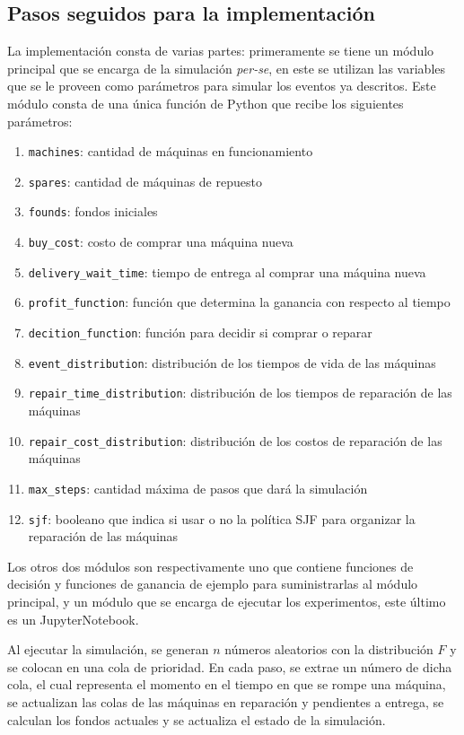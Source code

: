\documentclass[10pt,twocolumn]{article}
\begin{document}
\subsection{Pasos seguidos para la implementación}
La implementación consta de varias partes: primeramente se tiene un módulo principal que se encarga de la simulación \textit{per-se}, en este se utilizan las variables que se le proveen como parámetros para simular los eventos ya descritos. Este módulo consta de una única función de Python que recibe los siguientes parámetros:
\begin{enumerate}
    \item \texttt{machines}: cantidad de máquinas en funcionamiento
    \item \texttt{spares}: cantidad de máquinas de repuesto
    \item \texttt{founds}: fondos iniciales
    \item \texttt{buy\_cost}: costo de comprar una máquina nueva
    \item \texttt{delivery\_wait\_time}: tiempo de entrega al comprar una máquina nueva
    \item \texttt{profit\_function}: función que determina la ganancia con respecto al tiempo
    \item \texttt{decition\_function}: función para decidir si comprar o reparar
    \item \texttt{event\_distribution}: distribución de los tiempos de vida de las máquinas
    \item \texttt{repair\_time\_distribution}: distribución de los tiempos de reparación de las máquinas
    \item \texttt{repair\_cost\_distribution}: distribución de los costos de reparación de las máquinas
    \item \texttt{max\_steps}: cantidad máxima de pasos que dará la simulación
    \item \texttt{sjf}: booleano que indica si usar o no la política SJF para organizar la reparación de las máquinas
\end{enumerate}

Los otros dos módulos son respectivamente uno que contiene funciones de decisión y funciones de ganancia de ejemplo para suministrarlas al módulo principal, y un módulo que se encarga de ejecutar los experimentos, este último es un JupyterNotebook. 

Al ejecutar la simulación, se generan $n$ números aleatorios con la distribución $F$ y se colocan en una cola de prioridad. En cada paso, se extrae un número de dicha cola, el cual representa el momento en el tiempo en que se rompe una máquina, se actualizan las colas de las máquinas en reparación y pendientes a entrega, se calculan los fondos actuales y se actualiza el estado de la simulación.
\end{document}
